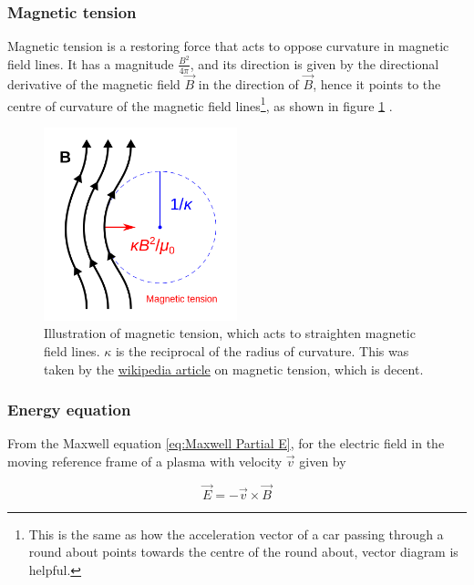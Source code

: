 \documentclass{article}
\begin{document}
\subsubsection{Magnetic tension}

Magnetic tension is a restoring force that acts to oppose curvature in magnetic field lines. It has a magnitude $\frac{B^2}{4\pi}$, and its direction is given by the directional derivative of the magnetic field $\Vec{B}$ in the direction of $\Vec{B}$, hence it points to the centre of curvature of the magnetic field lines\footnote{This is the same as how the acceleration vector of a car passing through a round about points towards the centre of the round about, vector diagram is helpful.}, as shown in figure \ref{fig:Magnetic tension} .

\begin{figure}
    \centering
    \includegraphics[width=0.5\textwidth]{images/Magnetic_tension_diagram.svg.png}
    \caption{Illustration of magnetic tension, which acts to straighten magnetic field lines. $\kappa$ is the reciprocal of the radius of curvature. This was taken by the \href{https://en.wikipedia.org/wiki/Magnetic_tension}{wikipedia article} on magnetic tension, which is decent.}
    \label{fig:Magnetic tension}
\end{figure}

\subsubsection{Energy equation}
From the Maxwell equation \ref{eq:Maxwell Partial E}, for the electric field in the moving reference frame of a plasma with velocity $\Vec{v}$ given by 

\begin{equation}\label{eq:Electric field in moving frame}
    \Vec{E} = -\Vec{v} \times \Vec{B}
\end{equation}
\end{document}
